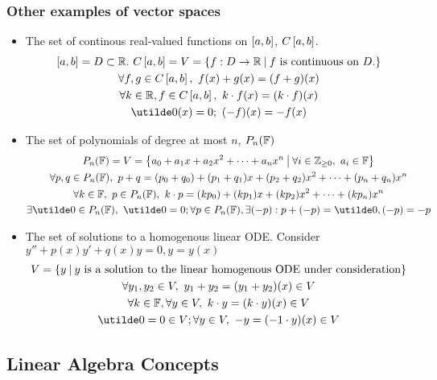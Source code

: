 \documentclass{report}
\begin{document}
\subsubsection*{Other examples of vector spaces}
\begin{itemize}
  \item The set of continous real-valued functions on $\left[ a,b \right]$, $C\left[ a,b \right]$.
  \begin{gather*}
    \sqbracks{a,b}=D\subset\bbr.\ C\sqbracks{a,b} = V = \braces{f:D\to\bbr\suchthat f \text{ is continuous on } D.} \\
    \forall f,g\in C\sqbracks{a,b},\ f(x)+g(x) = (f + g)(x) \\
    \forall k\in\bbr, f\in C\sqbracks{a,b},\ k\cd f(x) = (k\cd f)(x) \\
    \ut{0}(x) = 0;\ (-f)(x) = -f(x)  
  \end{gather*}
  \item The set of polynomials of degree at most $n$, $P_n(\mathbb{F})$
  \begin{gather*}
    P_n(\bbf) = V = \braces{a_0 + a_1x + a_2x^2 + \cdots + a_nx^n\suchthat \forall i \in\bbz_{\geq 0},\ a_i\in\bbf} \\
    \forall p,q\in P_n(\bbf),\ p+q = (p_0+q_0) + (p_1+q_1)x + (p_2+q_2)x^2 + \cdots + (p_n+q_n)x^n \\
    \forall k\in\bbf,\ p\in P_n(\bbf),\ k\cd p = (kp_0) + (kp_1)x + (kp_2)x^2 + \cdots + (kp_n)x^n \\
    \exists\ut{0}\in P_n(\bbf),\ \ut{0} = 0; \forall p\in P_n(\bbf), \exists(-p): p + (-p) = \ut{0}, (-p) = -p
  \end{gather*}
  \item The set of solutions to a homogenous linear ODE. Consider $y'' + p(x)y' + q(x)y = 0, y = y(x)$
  \begin{gather*}
    V = \braces{y \suchthat y \text{ is a solution to the linear homogenous ODE under consideration}} \\
    \forall y_1,y_2\in V,\ y_1 + y_2 = (y_1+y_2)(x) \in V \\
    \forall k\in\bbf, \forall y\in V,\ k\cd y = (k\cd y)(x)\in V \\
    \ut{0}=0\in V; \forall y\in V,\ -y = (-1\cd y)(x)\in V 
  \end{gather*}
\end{itemize}

\subsection{Linear Algebra Concepts}
\end{document}

